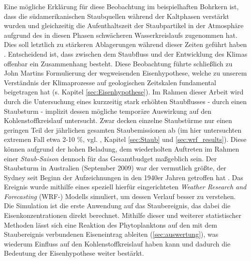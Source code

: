 \documentclass[12pt,a4paper,onecolumn]{scrartcl}
\begin{document}
Eine mögliche Erklärung für diese Beobachtung im beispielhaften Bohrkern ist, dass die südamerikanischen Staubquellen während der Kaltphasen verstärkt wurden und gleichzeitig die Aufenthaltszeit der Staubpartikel in der Atmosphäre aufgrund des in diesen Phasen schwächeren Wasserkreislaufs zugenommen hat. Dies soll letztlich zu stärkeren Ablagerungen während dieser Zeiten geführt haben \citep{Lambert.2008}. Entscheidend ist, dass zwischen dem Staubfluss und der Entwicklung des Klimas offenbar ein Zusammenhang besteht. Diese Beobachtung führte schließlich zu John Martins Formulierung der wegweisenden Eisenhypothese, welche zu unserem Verständnis der Klimaprozesse auf geologischen Zeitskalen fundamental beigetragen hat (s. Kapitel \ref{sec:Eisenhypothese}). Im Rahmen dieser Arbeit wird durch die Untersuchung eines kurzzeitig stark erhöhten Staubflusses - durch einen Staubsturm - implizit dessen mögliche temporäre Auswirkung auf den Kohlenstoffkreislauf untersucht. Zwar decken einzelne Staubstürme nur einen geringen Teil der jährlichen gesamten Staubemissionen ab (im hier untersuchten extremen Fall etwa 2-10 \%, vgl. \cite{Shao.2011}, Kapitel \ref{sec:Staub} und \ref{sec:wrf_results}). Diese können aufgrund der hohen Beladung, dem wiederholten Auftreten im Rahmen einer \textit{Staub-Saison} dennoch für das Gesamtbudget maßgeblich sein. Der Staubsturm in Australien (September 2009) war der vermutlich größte, der Sydney seit Beginn der Aufzeichnungen in den 1940er Jahren getroffen hat \citep{Leys.2011}. Das Ereignis wurde mithilfe eines speziell hierfür eingerichteten \textit{Weather Research and Forecasting} (WRF-) Modells simuliert, um dessen Verlauf besser zu verstehen. Die Simulation ist die erste Anwendung auf das Staubereignis, das dabei die Eisenkonzentrationen direkt berechnet. Mithilfe dieser und weiterer statistischer Methoden lässt sich eine Reaktion des Phytoplanktons auf den mit dem Staubereignis verbundenen Eiseneintrag ableiten (\ref{sec:auswertung}), was wiederum Einfluss auf den Kohlenstoffkreislauf haben kann und dadurch die Bedeutung der Eisenhypothese weiter bestärkt. \linebreak
\end{document}
